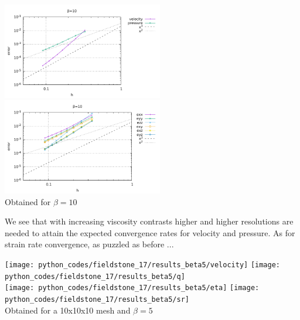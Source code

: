\begin{center}
\includegraphics[width=7cm]{python_codes/fieldstone_17/results_beta10/errors.pdf}
\includegraphics[width=7cm]{python_codes/fieldstone_17/results_beta10/errors_sr.pdf}\\
{\captionfont Obtained for $\beta=10$}
\end{center}

We see that with increasing viscosity contrasts higher and higher resolutions are needed to 
attain the expected convergence rates for velocity and pressure. As for strain rate convergence, 
as puzzled as before ...



\begin{center}
\texttt{[image: python\_codes/fieldstone\_17/results\_beta5/velocity]}
\texttt{[image: python\_codes/fieldstone\_17/results\_beta5/q]}\\
\texttt{[image: python\_codes/fieldstone\_17/results\_beta5/eta]}
\texttt{[image: python\_codes/fieldstone\_17/results\_beta5/sr]}\\
{\captionfont Obtained for a 10x10x10 mesh and $\beta=5$}
\end{center}



















